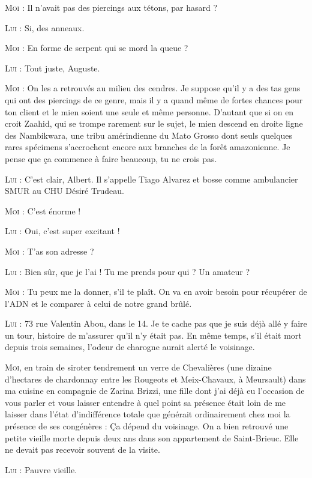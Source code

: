 \begin{dialogue}

\textsc{Moi} : Il n’avait pas des piercings aux tétons, par hasard ?

\textsc{Lui} : Si, des anneaux.


\illusloflabel{}
%
%
\textsc{Moi} : En forme de serpent qui se mord la queue ?

\textsc{Lui} : Tout juste, Auguste.

\textsc{Moi} : On les a retrouvés au milieu des cendres. Je suppose qu’il y a des tas gens qui ont des piercings de ce genre, mais il y a quand même de fortes chances pour ton client et le mien soient une seule et même personne. D’autant que si on en croit Zaahid, qui se trompe rarement sur le sujet, le mien descend en droite ligne des Nambikwara, une tribu amérindienne du Mato Grosso dont seuls quelques rares spécimens s’accrochent encore aux branches de la forêt amazonienne. Je pense que ça commence à faire beaucoup, tu ne crois pas.

\textsc{Lui} : C’est clair, Albert. Il s’appelle Tiago Alvarez et bosse comme ambulancier SMUR au CHU Désiré Trudeau.

\textsc{Moi} : C’est énorme !

\textsc{Lui} : Oui, c’est super excitant !

\textsc{Moi} : T’as son adresse ?

\textsc{Lui} : Bien sûr, que je l’ai ! Tu me prends pour qui ? Un amateur ?

\textsc{Moi} : Tu peux me la donner, s’il te plaît. On va en avoir besoin pour récupérer de l’ADN et le comparer à celui de notre grand brûlé.

\textsc{Lui} : 73 rue Valentin Abou, dans le 14\ieme{}. Je te cache pas que je suis déjà allé y faire un tour, histoire de m’assurer qu’il n’y était pas. En même temps, s’il était mort depuis trois semaines, l’odeur de charogne aurait alerté le voisinage.

\textsc{Moi}, en train de siroter tendrement un verre de Chevalières (une dizaine d’hectares de chardonnay entre les Rougeots et Meix-Chavaux, à Meursault) dans ma cuisine en compagnie de Zarina Brizzi, une fille dont j’ai déjà eu l’occasion de vous parler et vous laisser entendre à quel point sa présence était loin de me laisser dans l’état d’indifférence totale que générait ordinairement chez moi la présence de ses congénères : Ça dépend du voisinage. On a bien retrouvé une petite vieille morte depuis deux ans dans son appartement de Saint-Brieuc. Elle ne devait pas recevoir souvent de la visite.

\textsc{Lui} : Pauvre vieille.

\end{dialogue}

